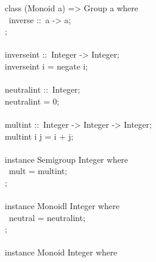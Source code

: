 \begin{isabellebody}
\begin{isamarkuptext}
\hspace*{0pt}class (Monoid a) => Group a where {}\\
\hspace*{0pt} ~inverse ::~a -> a;\\
\hspace*{0pt}{\char125};\\
\hspace*{0pt}\\
\hspace*{0pt}inverse{}int ::~Integer -> Integer;\\
\hspace*{0pt}inverse{}int i = negate i;\\
\hspace*{0pt}\\
\hspace*{0pt}neutral{}int ::~Integer;\\
\hspace*{0pt}neutral{}int = 0;\\
\hspace*{0pt}\\
\hspace*{0pt}mult{}int ::~Integer -> Integer -> Integer;\\
\hspace*{0pt}mult{}int i j = i + j;\\
\hspace*{0pt}\\
\hspace*{0pt}instance Semigroup Integer where {}\\
\hspace*{0pt} ~mult = mult{}int;\\
\hspace*{0pt}{\char125};\\
\hspace*{0pt}\\
\hspace*{0pt}instance Monoidl Integer where {}\\
\hspace*{0pt} ~neutral = neutral{}int;\\
\hspace*{0pt}{\char125};\\
\hspace*{0pt}\\
\hspace*{0pt}instance Monoid Integer where {}\\

\end{isamarkuptext}
\end{isabellebody}

